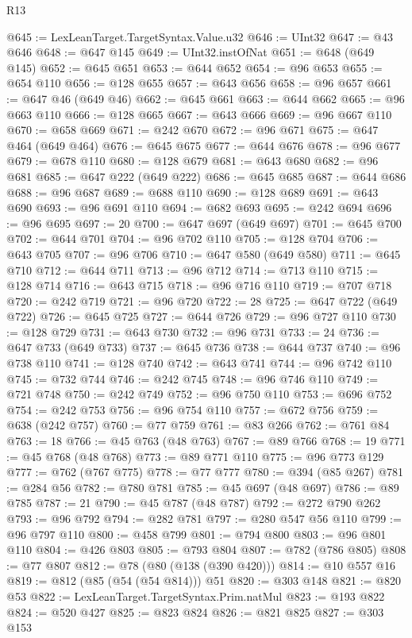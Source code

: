 \begin{lexlean}{R13}
\begin{coremodule}
@645 := LexLeanTarget.TargetSyntax.Value.u32
@646 := UInt32
@647 := @43 @646
@648 := @647 @145
@649 := UInt32.instOfNat
@651 := @648 (@649 @145)
@652 := @645 @651
@653 := @644 @652
@654 := @96 @653
@655 := @654 @110
@656 := @128 @655
@657 := @643 @656
@658 := @96 @657
@661 := @647 @46 (@649 @46)
@662 := @645 @661
@663 := @644 @662
@665 := @96 @663 @110
@666 := @128 @665
@667 := @643 @666
@669 := @96 @667 @110
@670 := @658 @669
@671 := @242 @670
@672 := @96 @671
@675 := @647 @464 (@649 @464)
@676 := @645 @675
@677 := @644 @676
@678 := @96 @677
@679 := @678 @110
@680 := @128 @679
@681 := @643 @680
@682 := @96 @681
@685 := @647 @222 (@649 @222)
@686 := @645 @685
@687 := @644 @686
@688 := @96 @687
@689 := @688 @110
@690 := @128 @689
@691 := @643 @690
@693 := @96 @691 @110
@694 := @682 @693
@695 := @242 @694
@696 := @96 @695
@697 := 20
@700 := @647 @697 (@649 @697)
@701 := @645 @700
@702 := @644 @701
@704 := @96 @702 @110
@705 := @128 @704
@706 := @643 @705
@707 := @96 @706
@710 := @647 @580 (@649 @580)
@711 := @645 @710
@712 := @644 @711
@713 := @96 @712
@714 := @713 @110
@715 := @128 @714
@716 := @643 @715
@718 := @96 @716 @110
@719 := @707 @718
@720 := @242 @719
@721 := @96 @720
@722 := 28
@725 := @647 @722 (@649 @722)
@726 := @645 @725
@727 := @644 @726
@729 := @96 @727 @110
@730 := @128 @729
@731 := @643 @730
@732 := @96 @731
@733 := 24
@736 := @647 @733 (@649 @733)
@737 := @645 @736
@738 := @644 @737
@740 := @96 @738 @110
@741 := @128 @740
@742 := @643 @741
@744 := @96 @742 @110
@745 := @732 @744
@746 := @242 @745
@748 := @96 @746 @110
@749 := @721 @748
@750 := @242 @749
@752 := @96 @750 @110
@753 := @696 @752
@754 := @242 @753
@756 := @96 @754 @110
@757 := @672 @756
@759 := @638 (@242 @757)
@760 := @77 @759
@761 := @83 @266
@762 := @761 @84
@763 := 18
@766 := @45 @763 (@48 @763)
@767 := @89 @766
@768 := 19
@771 := @45 @768 (@48 @768)
@773 := @89 @771 @110
@775 := @96 @773 @129
@777 := @762 (@767 @775)
@778 := @77 @777
@780 := @394 (@85 @267)
@781 := @284 @56
@782 := @780 @781
@785 := @45 @697 (@48 @697)
@786 := @89 @785
@787 := 21
@790 := @45 @787 (@48 @787)
@792 := @272 @790 @262
@793 := @96 @792
@794 := @282 @781
@797 := @280 @547 @56 @110
@799 := @96 @797 @110
@800 := @458 @799
@801 := @794 @800
@803 := @96 @801 @110
@804 := @426 @803
@805 := @793 @804
@807 := @782 (@786 @805)
@808 := @77 @807
@812 := @78 (@80 (@138 (@390 @420)))
@814 := @10 @557 @16
@819 := @812 (@85 (@54 (@54 @814))) @51
@820 := @303 @148
@821 := @820 @53
@822 := LexLeanTarget.TargetSyntax.Prim.natMul
@823 := @193 @822
@824 := @520 @427
@825 := @823 @824
@826 := @821 @825
@827 := @303 @153

\end{coremodule}
\end{lexlean}
